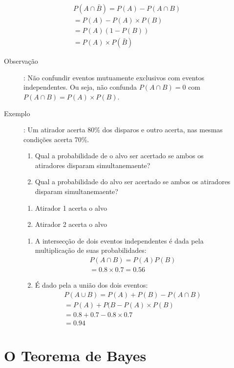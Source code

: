 \documentclass[11pt,a4paper]{book}
\begin{document}
\begin{description}
\begin{description}
 \begin{align*}
   P(A \cap \bar{B})= P(A) - P(A \cap B)\\
   = P(A)-P(A)\times P(B)\\
   = P(A)(1-P(B))\\
   =P(A)\times P(\bar{B})
 \end{align*}

 \item [Observação]: Não confundir eventos mutuamente exclusivos com eventos independentes. Ou seja, não confunda $P(A \cap B)  = 0$ com $ P(A \cap B) = P(A)\times P(B)$.

 \item[Exemplo]: Um atirador acerta 80\% dos disparos e outro acerta, nas mesmas condições
 acerta 70\%.
 \begin{enumerate}[label=(\alph*)]
   \item Qual a probabilidade de o alvo ser acertado se ambos os atiradores disparam 
     simultanemaente?
   \item Qual a probabilidade do alvo ser acertado se ambos os atiradores disparam 
     simultanemaente?
 \end{enumerate}
 \begin{enumerate}[label=\Alph*:]
   \item  Atirador 1 acerta o alvo
   \item Atirador 2 acerta o alvo
 \end{enumerate}
 \begin{enumerate}[label=(\alph*)]
   \item  A intersecção de dois eventos independentes é dada pela multiplicação de suas probabilidades:
     \begin{align*}
       P(A \cap B)= P(A)P(B)\\
       =0.8 \times 0.7= 0.56
     \end{align*}
   \item É dado pela a união dos dois eventos:
     \begin{align*}
       P(A \cup B)= P(A)+ P(B)- P( A \cap B )\\
       = P(A) + P(B- P(A)\times P(B)\\
       = 0.8+0.7 - 0.8\times 0.7\\
       =0.94
     \end{align*}
 \end{enumerate}

 \end{description}
 \section{O Teorema de Bayes}

\end{description}
\end{document}
